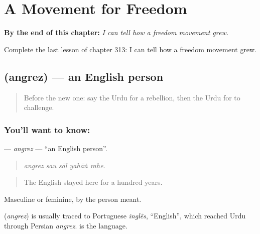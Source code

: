 
\chapter{A Movement for Freedom}
\label{ch:ur-a-movement-for-freedom}

\begin{chapteropening}
\textbf{By the end of this chapter:} \emph{I can tell how a freedom movement grew.}

Complete the last lesson of chapter 313: I can tell how a freedom movement grew.
\end{chapteropening}

\section[\texorpdfstring{\ur{انگریز} (angrez)}{انگریز (angrez)}]{ (angrez) — an English person}

\label{lesson:UR-C313-angrez}



\begin{quote}
Before the new one: say the Urdu for a rebellion, then the Urdu for to challenge.
\end{quote}

\subsection*{You'll want to know: }
\textbf{} — \emph{angrez} — \textquotedblleft{}an English person\textquotedblright{}.

\begin{quote}
    
\end{quote}

\begin{quote}
\emph{angrez sau sāl yahāṅ rahe.}
\end{quote}

\begin{quote}
The English stayed here for a hundred years.
\end{quote}

Masculine or feminine, by the person meant.

\begin{cousinweb}
\textbf{} (\emph{angrez}) is usually traced to Portuguese \emph{inglês}, \textquotedblleft{}English\textquotedblright{}, which reached Urdu through Persian \emph{angrez}. \textbf{} is the language.
\end{cousinweb}

